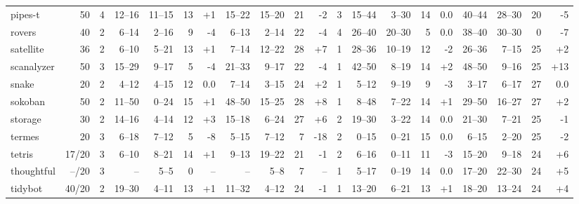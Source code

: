 \documentclass{article}
\begin{document}
\begin{table}
\begin{tabular}{l@{}rr|rrrr|rrrr|r|rrrr|rrrr}
      pipes-t &    50 &   4 &  12--16 & 11--15 &  13 & {\color{blue}+1} &  15--22 & 15--20 &  21 &   {\color{red}-2} &   3 &   15--44 &  3--30 &  14 &               0.0 &   40--44 & 28--30 &  20 &   {\color{red}-5} \\
       rovers &    40 &   2 &   6--14 &  2--16 &   9 &  {\color{red}-4} &   6--13 &  2--14 &  22 &   {\color{red}-4} &   4 &   26--40 & 20--30 &   5 &               0.0 &   38--40 & 30--30 &   0 &   {\color{red}-7} \\
    satellite &    36 &   2 &   6--10 &  5--21 &  13 & {\color{blue}+1} &   7--14 & 12--22 &  28 &  {\color{blue}+7} &   1 &   28--36 & 10--19 &  12 &   {\color{red}-2} &   26--36 &  7--15 &  25 &  {\color{blue}+2} \\
   scanalyzer &    50 &   3 &  15--29 &  9--17 &   5 &  {\color{red}-4} &  21--33 &  9--17 &  22 &   {\color{red}-4} &   1 &   42--50 &  8--19 &  14 &  {\color{blue}+2} &   48--50 &  9--16 &  25 & {\color{blue}+13} \\
        snake &    20 &   2 &   4--12 &  4--15 &  12 &              0.0 &   7--14 &  3--15 &  24 &  {\color{blue}+2} &   1 &    5--12 &  9--19 &   9 &   {\color{red}-3} &    3--17 &  6--17 &  27 &               0.0 \\
      sokoban &    50 &   2 &  11--50 &  0--24 &  15 & {\color{blue}+1} &  48--50 & 15--25 &  28 &  {\color{blue}+8} &   1 &    8--48 &  7--22 &  14 &  {\color{blue}+1} &   29--50 & 16--27 &  27 &  {\color{blue}+2} \\
      storage &    30 &   2 &  14--16 &  4--14 &  12 & {\color{blue}+3} &  15--18 &  6--24 &  27 &  {\color{blue}+6} &   2 &   19--30 &  3--22 &  14 &               0.0 &   21--30 &  7--21 &  25 &   {\color{red}-1} \\
       termes &    20 &   3 &   6--18 &  7--12 &   5 &  {\color{red}-8} &   5--15 &  7--12 &   7 &  {\color{red}-18} &   2 &    0--15 &  0--21 &  15 &               0.0 &    6--15 &  2--20 &  25 &   {\color{red}-2} \\
       tetris & 17/20 &   3 &   6--10 &  8--21 &  14 & {\color{blue}+1} &   9--13 & 19--22 &  21 &   {\color{red}-1} &   2 &    6--16 &  0--11 &  11 &   {\color{red}-3} &   15--20 &  9--18 &  24 &  {\color{blue}+6} \\
   thoughtful & --/20 &   3 &      -- &   5--5 &   0 &               -- &      -- &   5--8 &   7 &                -- &   1 &    5--17 &  0--19 &  14 &               0.0 &   17--20 & 22--30 &  24 &  {\color{blue}+5} \\
      tidybot & 40/20 &   2 &  19--30 &  4--11 &  13 & {\color{blue}+1} &  11--32 &  4--12 &  24 &   {\color{red}-1} &   1 &   13--20 &  6--21 &  13 &  {\color{blue}+1} &   18--20 & 13--24 &  24 &  {\color{blue}+4} \\

\end{tabular}
\end{table}
\end{document}
